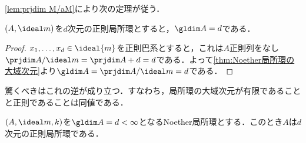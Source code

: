 \ref{lem:prjdim M/aM}により次の定理が従う．

\begin{thm}
	$(A,\ideal m)$を$d$次元の正則局所環とすると，$\gldim A=d$である．
\end{thm}

\begin{proof}
	$x_1,\dots,x_d\in\ideal{m}$を正則巴系とすると，これは$A$正則列をなし$\prjdim A/\ideal m=\prjdim A+d=d$である．よって\ref{thm:Noether局所環の大域次元}より$\gldim A=\prjdim A/\ideal m=d$である．
\end{proof}

驚くべきはこれの逆が成り立つ．すなわち，局所環の大域次元が有限であることと正則であることは同値である．

\begin{thm}[Serre]
	$(A,\ideal m,k)$を$\gldim A=d<\infty$となるNoether局所環とする．このとき$A$は$d$次元の正則局所環である．
\end{thm}

